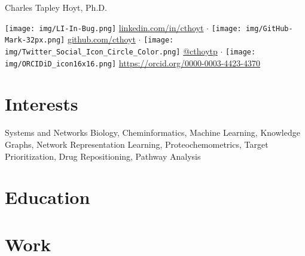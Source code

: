 \documentclass[11pt,a4paper,sans]{moderncv} %
\begin{document}
{\Huge Charles Tapley Hoyt, Ph.D.}

\vspace{3mm}

\texttt{[image: img/LI-In-Bug.png]}
\href{https://linkedin.com/in/cthoyt}{linkedin.com/in/cthoyt}
$\cdot$
\texttt{[image: img/GitHub-Mark-32px.png]}
\href{https://github.com/cthoyt}{github.com/cthoyt}
$\cdot$
\texttt{[image: img/Twitter\_Social\_Icon\_Circle\_Color.png]}
\href{https://twitter.com/cthoytp}{@cthoytp}
$\cdot$
\texttt{[image: img/ORCIDiD\_icon16x16.png]}
\href{https://orcid.org/0000-0003-4423-4370}{https://orcid.org/0000-0003-4423-4370}



\section{Interests}

Systems and Networks Biology, Cheminformatics, Machine Learning, Knowledge Graphs, Network Representation Learning, Proteochemometrics, Target Prioritization, Drug Repositioning, Pathway Analysis 

\section{Education}





\section{Work}




\end{document}
